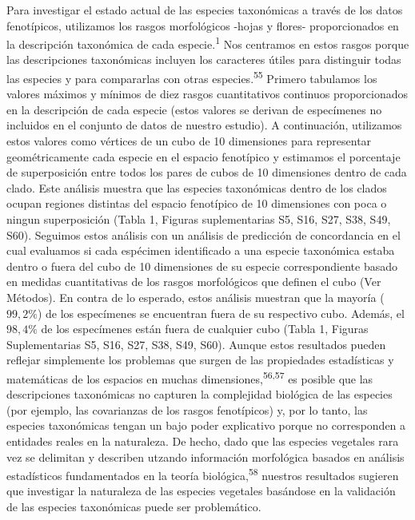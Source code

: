 \documentclass[
  11pt,
]{article}
\begin{document}
Para investigar el estado actual de las especies taxonómicas a través de los datos fenotípicos, utilizamos los rasgos morfológicos -hojas y flores- proporcionados en la descripción taxonómica de cada especie.\textsuperscript{1} Nos centramos en estos rasgos porque las descripciones taxonómicas incluyen los caracteres útiles para distinguir todas las especies y para compararlas con otras especies.\textsuperscript{55} Primero tabulamos los valores máximos y mínimos de diez rasgos cuantitativos continuos proporcionados en la descripción de cada especie (estos valores se derivan de especímenes no incluidos en el conjunto de datos de nuestro estudio). A continuación, utilizamos estos valores como vértices de un cubo de 10 dimensiones para representar geométricamente cada especie en el espacio fenotípico y estimamos el porcentaje de superposición entre todos los pares de cubos de 10 dimensiones dentro de cada clado. Este análisis muestra que las especies taxonómicas dentro de los clados ocupan regiones distintas del espacio fenotípico de 10 dimensiones con poca o ningun superposición (Tabla 1, Figuras suplementarias S5, S16, S27, S38, S49, S60). Seguimos estos análisis con un análisis de predicción de concordancia en el cual evaluamos si cada espécimen identificado a una especie taxonómica estaba dentro o fuera del cubo de 10 dimensiones de su especie correspondiente basado en medidas cuantitativas de los rasgos morfológicos que definen el cubo (Ver Métodos). En contra de lo esperado, estos análisis muestran que la mayoría (\(99,2\%\)) de los especímenes se encuentran fuera de su respectivo cubo. Además, el \(98,4\%\) de los especímenes están fuera de cualquier cubo (Tabla 1, Figuras Suplementarias S5, S16, S27, S38, S49, S60). Aunque estos resultados pueden reflejar simplemente los problemas que surgen de las propiedades estadísticas y matemáticas de los espacios en muchas dimensiones,\textsuperscript{56,57} es posible que las descripciones taxonómicas no capturen la complejidad biológica de las especies (por ejemplo, las covarianzas de los rasgos fenotípicos) y, por lo tanto, las especies taxonómicas tengan un bajo poder explicativo porque no corresponden a entidades reales en la naturaleza. De hecho, dado que las especies vegetales rara vez se delimitan y describen utzando información morfológica basados en análisis estadísticos fundamentados en la teoría biológica,\textsuperscript{58} nuestros resultados sugieren que investigar la naturaleza de las especies vegetales basándose en la validación de las especies taxonómicas puede ser problemático.
\end{document}
